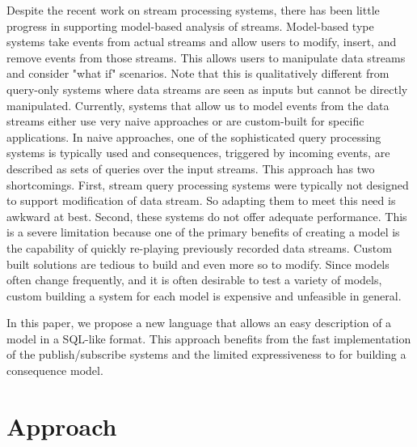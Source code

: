 \documentclass{article}
\begin{document}
Despite the recent work on stream processing systems, there has been little progress in supporting model-based analysis of streams. Model-based type systems take events from actual streams and allow users to modify, insert, and remove events from those streams. This allows users to manipulate data streams and consider "what if" scenarios. Note that this is qualitatively different from query-only systems where data streams are seen as inputs but cannot be directly manipulated. Currently, systems that allow us to model events from the data streams either use very naive approaches or are custom-built for specific applications. In naive approaches, one of the sophisticated query processing systems is typically used and consequences, triggered by incoming events, are described as sets of queries over the input streams. This approach has two shortcomings. First, stream query processing systems were typically not designed to support modification of data stream. So adapting them to meet this need is awkward at best. Second, these systems do not offer adequate performance. This is a severe limitation because one of the primary benefits of creating a model is the capability of quickly re-playing previously recorded data streams. Custom built solutions are tedious to build and even more so to modify. Since models often change frequently, and it is often desirable to test a variety of models, custom building a system for each model is expensive and unfeasible in general. 

In this paper, we propose a new language that allows an easy description of a model in a SQL-like format. This approach benefits from the fast implementation of the publish/subscribe systems and the limited expressiveness to for building a consequence model. 






\section{Approach}
\end{document}
